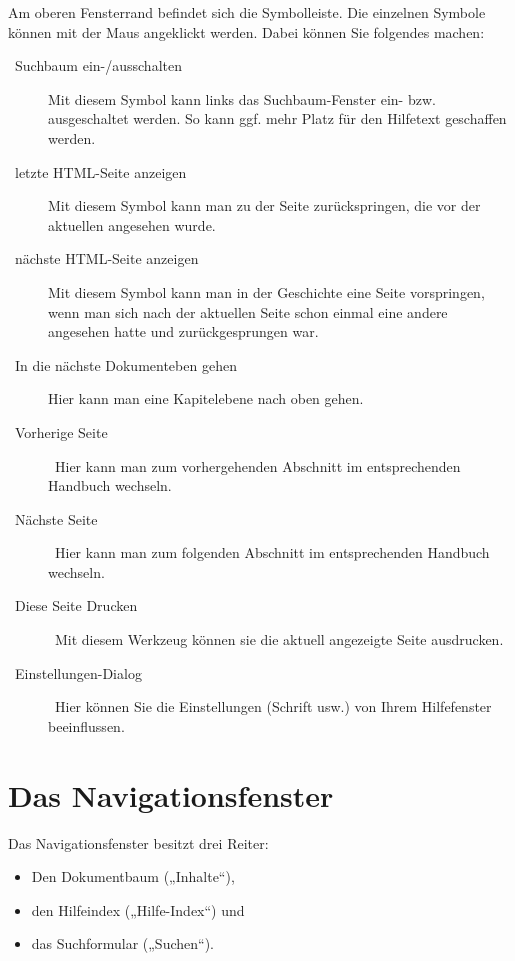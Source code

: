 Am oberen Fensterrand befindet sich die Symbolleiste. Die einzelnen Symbole können mit der Maus angeklickt werden. Dabei können Sie folgendes machen:

\begin{description}
\item[~Suchbaum ein-/ausschalten] Mit diesem Symbol kann links das Suchbaum-Fenster ein- bzw. ausgeschaltet werden. So kann ggf. mehr Platz für den Hilfetext geschaffen werden.
\item[~letzte HTML-Seite anzeigen] Mit diesem Symbol kann man zu der Seite zurückspringen, die vor der aktuellen angesehen wurde.
\item[~nächste HTML-Seite anzeigen] Mit diesem Symbol kann man in der Geschichte eine Seite vorspringen, wenn man sich nach der aktuellen Seite schon einmal eine andere angesehen hatte und zurückgesprungen war.
\item[~In die nächste Dokumenteben gehen] Hier kann man eine Kapitelebene nach oben gehen.
\item[~Vorherige Seite]~Hier kann man zum vorhergehenden Abschnitt im entsprechenden Handbuch wechseln.
\item[~Nächste Seite]~Hier kann man zum folgenden Abschnitt im entsprechenden Handbuch wechseln.
\item[~Diese Seite Drucken]~Mit diesem Werkzeug können sie die aktuell angezeigte Seite ausdrucken.
\item[~Einstellungen-Dialog]~Hier können Sie die Einstellungen (Schrift usw.) von Ihrem Hilfefenster beeinflussen. 
\end{description}

\section{Das Navigationsfenster}
\label{sec:der-suchbaum}


Das Navigationsfenster besitzt drei Reiter:
\begin{itemize}
\item Den Dokumentbaum („Inhalte“),
\item den Hilfeindex („Hilfe-Index“) und
\item das Suchformular („Suchen“).
\end{itemize}

